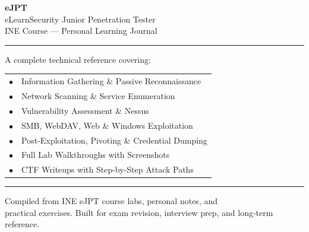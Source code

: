 \documentclass[11pt,a4paper,openany]{book}
\begin{document}
\begin{titlepage}
  \pagecolor{titlebg}\color{white}
  \vspace*{2.5cm}
  \begin{center}
    {\fontsize{52}{60}\selectfont\bfseries eJPT}\\[8pt]
    {\Large\color{rulecolor}eLearnSecurity Junior Penetration Tester}\\[4pt]
    {\normalsize\color{midgrey}INE Course --- Personal Learning Journal}
  \end{center}
  \vspace{1.2cm}
  {\color{accent}\rule{\linewidth}{2pt}}
  \vspace{1cm}
  \begin{center}
    {\large\color{rulecolor}A complete technical reference covering:}\\[14pt]
    \begin{tabular}{cl}
      \color{accent}$\bullet$ & \color{white}Information Gathering \& Passive Reconnaissance \\[5pt]
      \color{accent}$\bullet$ & \color{white}Network Scanning \& Service Enumeration \\[5pt]
      \color{accent}$\bullet$ & \color{white}Vulnerability Assessment \& Nessus \\[5pt]
      \color{accent}$\bullet$ & \color{white}SMB, WebDAV, Web \& Windows Exploitation \\[5pt]
      \color{accent}$\bullet$ & \color{white}Post-Exploitation, Pivoting \& Credential Dumping \\[5pt]
      \color{accent}$\bullet$ & \color{white}Full Lab Walkthroughs with Screenshots \\[5pt]
      \color{accent}$\bullet$ & \color{white}CTF Writeups with Step-by-Step Attack Paths \\[5pt]
    \end{tabular}
  \end{center}
  \vfill
  {\color{accent}\rule{\linewidth}{1pt}}
  \vspace{0.5cm}
  \begin{center}
    {\small\color{midgrey}Compiled from INE eJPT course labs, personal notes, and\\
    practical exercises. Built for exam revision, interview prep, and long-term reference.}
  \end{center}
\end{titlepage}
\pagecolor{white}\color{black}
\end{document}
